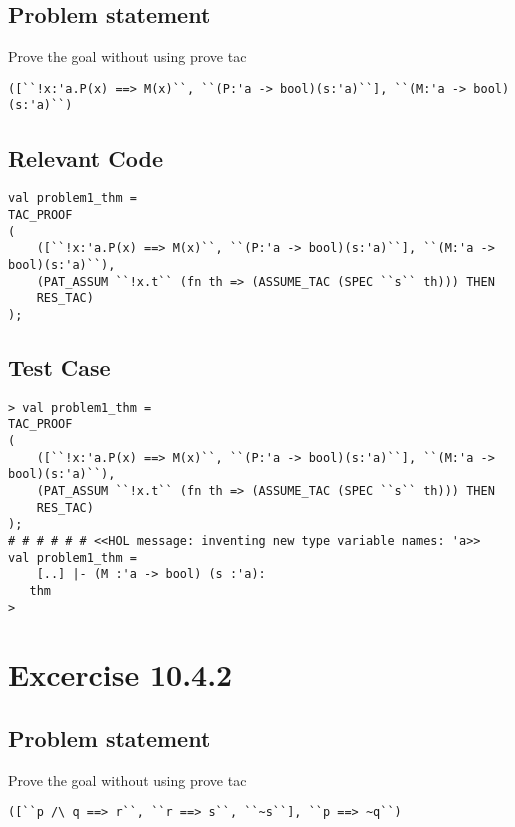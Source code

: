 \documentclass{report}
\begin{document}
\section{Problem statement}
\label{problem-statement-10-4-1}
Prove the goal without using prove tac
\begin{lstlisting}[frame=tblr]
([``!x:'a.P(x) ==> M(x)``, ``(P:'a -> bool)(s:'a)``], ``(M:'a -> bool)(s:'a)``)
\end{lstlisting}

\section{Relevant Code}
\label{rel-code-10-4-1}
\begin{lstlisting}[frame=TBlr]
val problem1_thm =
TAC_PROOF
(
	([``!x:'a.P(x) ==> M(x)``, ``(P:'a -> bool)(s:'a)``], ``(M:'a -> bool)(s:'a)``),
	(PAT_ASSUM ``!x.t`` (fn th => (ASSUME_TAC (SPEC ``s`` th))) THEN
	RES_TAC)
);
\end{lstlisting}

\section{Test Case}
\label{trans-10-4-1}
\begin{session}
  \begin{scriptsize}
\begin{verbatim}
> val problem1_thm =
TAC_PROOF
(
	([``!x:'a.P(x) ==> M(x)``, ``(P:'a -> bool)(s:'a)``], ``(M:'a -> bool)(s:'a)``),
	(PAT_ASSUM ``!x.t`` (fn th => (ASSUME_TAC (SPEC ``s`` th))) THEN
	RES_TAC)
);
# # # # # # <<HOL message: inventing new type variable names: 'a>>
val problem1_thm =
    [..] |- (M :'a -> bool) (s :'a):
   thm
> 
\end{verbatim}
  \end{scriptsize}
\end{session}

\chapter{Excercise 10.4.2}
\label{cha:10-4-2}

\section{Problem statement}
\label{problem-statement-10-4-2}
Prove the goal without using prove tac
\begin{lstlisting}[frame=tblr]
([``p /\ q ==> r``, ``r ==> s``, ``~s``], ``p ==> ~q``)
\end{lstlisting}
\end{document}
